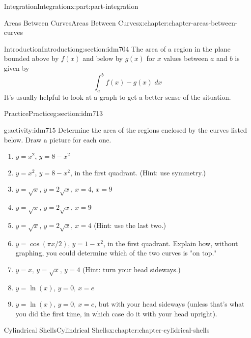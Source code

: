 \documentclass[oneside,10pt,]{book}
\numberwithin{equation}{section}
\begin{document}
\begin{partptx}{Integration}{}{Integration}{}{}{x:part:part-integration}
\begin{chapterptx}{Areas Between Curves}{}{Areas Between Curves}{}{}{x:chapter:chapter-areas-between-curves}
\begin{sectionptx}{Introduction}{}{Introduction}{}{}{g:section:idm704}
The area of a region in the plane bounded above by \(f(x)\) and below by \(g(x)\) for \(x\) values between \(a\) and \(b\) is given by%
\begin{equation*}
\int_a^b f(x) - g(x) \; dx
\end{equation*}
It's usually helpful to look at a graph to get a better sense of the situation.%
\end{sectionptx}
%
%
\typeout{************************************************}
\typeout{************************************************}
%
\begin{sectionptx}{Practice}{}{Practice}{}{}{g:section:idm713}
\begin{activity}{}{g:activity:idm715}%
Determine the area of the regions enclosed by the curves listed below. Draw a picture for each one.%
\begin{enumerate}[font=\bfseries,label=(\alph*),ref=\alph*]
\item{}\(y=x^2\), \(y=8-x^2\)\item{}\(y=x^2\), \(y=8-x^2\), in the first quadrant. (Hint: use symmetry.)\item{}\(y=\sqrt{x}\), \(y=2\sqrt{x}\), \(x=4\), \(x=9\)\item{}\(y=\sqrt{x}\), \(y=2\sqrt{x}\), \(x=9\)\item{}\(y=\sqrt{x}\), \(y=2\sqrt{x}\), \(x=4\) (Hint: use the last two.)\item{}\(y=\cos(\pi x / 2)\), \(y= 1-x^2\), in the first quadrant. Explain how, without graphing, you could determine which of the two curves is "on top."\item{}\(y=x\), \(y=\sqrt{x}\), \(y=4\) (Hint: turn your head sideways.)\item{}\(y=\ln(x)\), \(y=0\), \(x=e\)\item{}\(y=\ln(x)\), \(y=0\), \(x=e\), but with your head sideways (unless that's what you did the first time, in which case do it with your head upright).\end{enumerate}
\end{activity}
\end{sectionptx}
\end{chapterptx}
%
\typeout{************************************************}
\typeout{************************************************}
%
\begin{chapterptx}{Cylindrical Shells}{}{Cylindrical Shells}{}{}{x:chapter:chapter-cylidrical-shells}
%
%
\typeout{************************************************}

\end{chapterptx}
\end{partptx}
\end{document}
